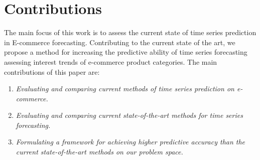 \section{Contributions}
\label{sections:Introduction:Contributions}

The main focus of this work is to assess the current state of time series prediction in E-commerce forecasting.
Contributing to the current state of the art,
we propose a method for increasing the predictive ability of time series forecasting
assessing interest trends of e-commerce product categories.
The main contributions of this paper are:

\begin{enumerate}
    \item {\it Evaluating and comparing current methods of time series prediction on e-commerce.}
    \item {\it Evaluating and comparing current state-of-the-art methods for time series forecasting.}
    \item {\it Formulating a framework for achieving higher predictive accuracy than the current state-of-the-art methods on our problem space.}
\end{enumerate}

